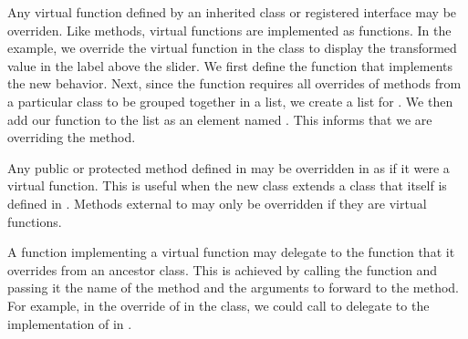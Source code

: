 \documentclass[article,shortnames]{jss}
\begin{document}
Any virtual function defined by an inherited class or registered
interface may be overriden. Like methods, virtual functions are
implemented as  functions.
In the  example, we override the
 virtual function in the  class to
display the transformed value in the label above the slider. We first
define the  function that implements the new behavior.
Next, since the  function requires all overrides of
methods from a particular class to be grouped together in a list, we
create a list for . We then add our 
function to the list as an element named . This
informs  that we are overriding the 
method. 

Any public or protected method defined in  may be
overridden in  as if it were a virtual function. This is
useful when the new class extends a class that itself is defined in
. Methods external to  may only be overridden
if they are virtual functions.

A function implementing a
virtual function may delegate to the function that it overrides from
an ancestor class. This is achieved by calling the
 function and passing it the name of the method
and the arguments to forward to the method. For example, in the
override of  in the 
class, we could call  to
delegate to the implementation of  in
.


\end{document}
